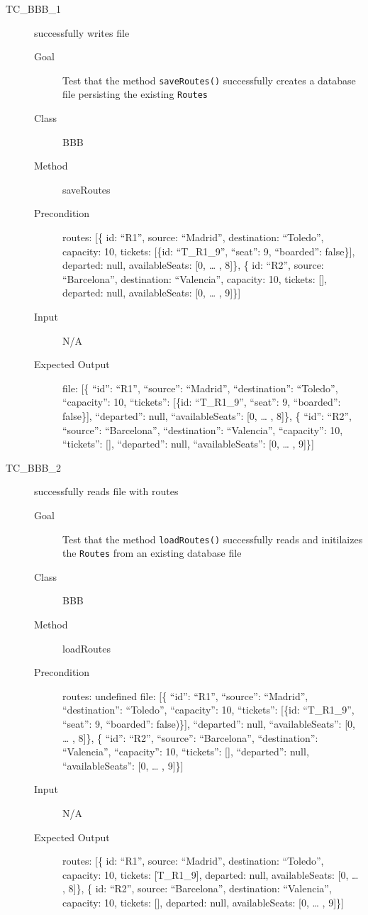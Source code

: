 \documentclass[11pt]{article}
\begin{document}
\begin{description}
\item[{TC\_BBB\_1}] successfully writes file
\begin{description}
\item[{Goal}] Test that the method \texttt{saveRoutes()} successfully creates a database file persisting the existing \texttt{Routes}
\item[{Class}] BBB
\item[{Method}] saveRoutes
\item[{Precondition}] routes: [\{ id: “R1”, source: “Madrid”, destination: “Toledo”, capacity: 10,  tickets: [\{id: “T\_R1\_9”, “seat”: 9, “boarded”: false\}], departed: null, availableSeats: [0, … , 8]\},
\{ id: “R2”, source: “Barcelona”, destination: “Valencia”, capacity: 10,  tickets: [], departed: null, availableSeats: [0, … , 9]\}]
\item[{Input}] N/A
\item[{Expected Output}] file: [\{ “id”: “R1”, “source”: “Madrid”, “destination”: “Toledo”, “capacity”: 10,  “tickets”: [\{id: “T\_R1\_9”, “seat”: 9, “boarded”: false\}], “departed”: null, “availableSeats”: [0, … , 8]\},
\{ “id”: “R2”, “source”: “Barcelona”, “destination”: “Valencia”, “capacity”: 10,  “tickets”: [], “departed”: null, “availableSeats”: [0, … , 9]\}]
\end{description}

\item[{TC\_BBB\_2}] successfully reads file with routes
\begin{description}
\item[{Goal}] Test that the method \texttt{loadRoutes()} successfully reads and initilaizes the \texttt{Routes} from an existing database file
\item[{Class}] BBB
\item[{Method}] loadRoutes
\item[{Precondition}] routes: undefined
file: [\{ “id”: “R1”, “source”: “Madrid”, “destination”: “Toledo”, “capacity”: 10,  “tickets”: [\{id: “T\_R1\_9”, “seat”: 9, “boarded”: false)\}], “departed”: null, “availableSeats”: [0, … , 8]\},
        \{ “id”: “R2”, “source”: “Barcelona”, “destination”: “Valencia”, “capacity”: 10,  “tickets”: [], “departed”: null, “availableSeats”: [0, … , 9]\}]
\item[{Input}] N/A
\item[{Expected Output}] routes: [\{ id: “R1”, source: “Madrid”, destination: “Toledo”, capacity: 10,  tickets: [T\_R1\_9], departed: null, availableSeats: [0, … , 8]\},
\{ id: “R2”, source: “Barcelona”, destination: “Valencia”, capacity: 10,  tickets: [], departed: null, availableSeats: [0, … , 9]\}]
\end{description}


\end{description}
\end{document}
